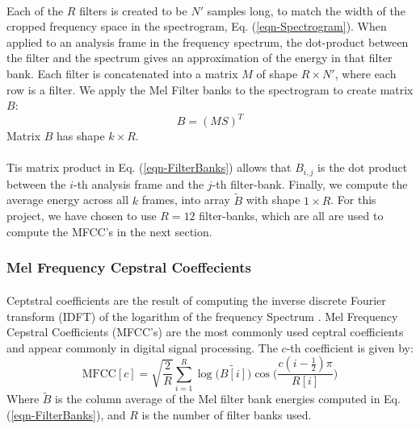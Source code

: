 \documentclass[12pt,letterpaper]{article}
\begin{document}
\paragraph*{}Each of the $R$ filters is created to be $N'$ samples long, to match the width of the cropped frequency space in the spectrogram, Eq. (\ref{eqn-Spectrogram}). When applied to an analysis frame in the frequency spectrum, the dot-product between the filter and the spectrum gives an approximation of the energy in that filter bank. Each filter is concatenated into a matrix $M$ of shape $R \times N'$, where each row is a filter. We apply the Mel Filter banks to the spectrogram to create matrix $B$:
\begin{equation}
\label{eqn-FilterBanks}
B = (MS)^T
\end{equation}
Matrix $B$ has shape $k \times R$.

\paragraph*{}Tis matrix product in Eq. (\ref{eqn-FilterBanks}) allows that $B_{i,j}$ is the dot product between the $i$-th analysis frame and the $j$-th filter-bank. Finally, we compute the average energy across all $k$ frames, into array $\widetilde{B}$ with shape $1 \times R$. For this project, we have chosen to use $R = 12$ filter-banks, which are all are used to compute the MFCC's in the next section.


\subsubsection{Mel Frequency Cepstral Coeffecients}

\paragraph*{}Ceptstral coefficients are the result of computing the inverse discrete Fourier transform (IDFT) of the logarithm of the frequency Spectrum \cite{Serizel,Sahidullah}. Mel Frequency Cepstral Coefficients (MFCC's) are the most commonly used ceptral coefficients and appear commonly in digital signal processing. The $c$-th coefficient is given by:
\begin{equation}
\label{feat-MFCC}
\text{MFCC}[c] = \sqrt{\frac{2}{R}} \sum_{i=1}^{R} 
\log\big(\widetilde{B[i]}\big) \cos\bigg(\frac{c(i-\frac{1}{2})\pi}{R[i]}\bigg)
\end{equation}
Where $\widetilde{B}$ is the column average of the Mel filter bank energies computed in Eq. (\ref{eqn-FilterBanks}), and $R$ is the number of filter banks used.
\end{document}

